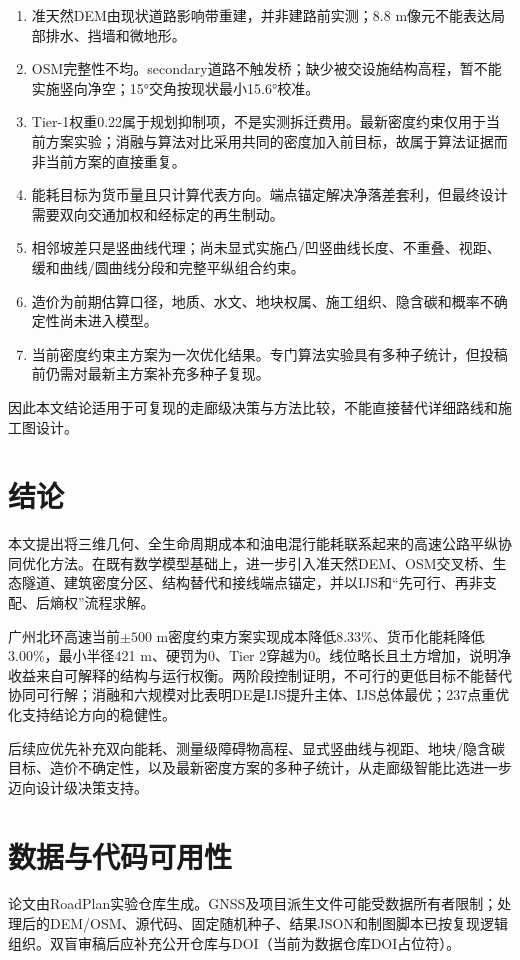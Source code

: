 \documentclass[preprint,12pt]{elsarticle}
\begin{document}
\begin{enumerate}[leftmargin=*,label=(\arabic*)]
\item 准天然DEM由现状道路影响带重建，并非建路前实测；8.8 m像元不能表达局部排水、挡墙和微地形。
\item OSM完整性不均。secondary道路不触发桥；缺少被交设施结构高程，暂不能实施竖向净空；15°交角按现状最小15.6°校准。
\item Tier-1权重0.22属于规划抑制项，不是实测拆迁费用。最新密度约束仅用于当前方案实验；消融与算法对比采用共同的密度加入前目标，故属于算法证据而非当前方案的直接重复。
\item 能耗目标为货币量且只计算代表方向。端点锚定解决净落差套利，但最终设计需要双向交通加权和经标定的再生制动。
\item 相邻坡差只是竖曲线代理；尚未显式实施凸/凹竖曲线长度、不重叠、视距、缓和曲线/圆曲线分段和完整平纵组合约束。
\item 造价为前期估算口径，地质、水文、地块权属、施工组织、隐含碳和概率不确定性尚未进入模型。
\item 当前密度约束主方案为一次优化结果。专门算法实验具有多种子统计，但投稿前仍需对最新主方案补充多种子复现。
\end{enumerate}

因此本文结论适用于可复现的走廊级决策与方法比较，不能直接替代详细路线和施工图设计。

\section{结论}

本文提出将三维几何、全生命周期成本和油电混行能耗联系起来的高速公路平纵协同优化方法。在既有数学模型基础上，进一步引入准天然DEM、OSM交叉桥、生态隧道、建筑密度分区、结构替代和接线端点锚定，并以IJS和“先可行、再非支配、后熵权”流程求解。

广州北环高速当前$\pm500$ m密度约束方案实现成本降低8.33\%、货币化能耗降低3.00\%，最小半径421 m、硬罚为0、Tier 2穿越为0。线位略长且土方增加，说明净收益来自可解释的结构与运行权衡。两阶段控制证明，不可行的更低目标不能替代协同可行解；消融和六规模对比表明DE是IJS提升主体、IJS总体最优；237点重优化支持结论方向的稳健性。

后续应优先补充双向能耗、测量级障碍物高程、显式竖曲线与视距、地块/隐含碳目标、造价不确定性，以及最新密度方案的多种子统计，从走廊级智能比选进一步迈向设计级决策支持。

\section*{数据与代码可用性}
论文由RoadPlan实验仓库生成。GNSS及项目派生文件可能受数据所有者限制；处理后的DEM/OSM、源代码、固定随机种子、结果JSON和制图脚本已按复现逻辑组织。双盲审稿后应补充公开仓库与DOI（当前为数据仓库DOI占位符）。
\end{document}
